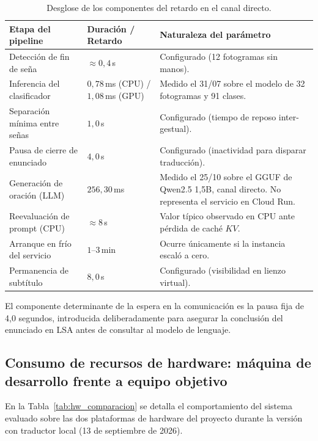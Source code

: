 \begin{table}[H]
    \centering
    \small
    \caption{Desglose de los componentes del retardo en el canal directo.}
    \label{tab:latencias_etapas}
    \begin{tabularx}{\textwidth}{@{}>{\raggedright\arraybackslash}p{} >{\raggedright\arraybackslash}p{} >{\raggedright\arraybackslash}X@{}}
        \toprule
        \textbf{Etapa del pipeline} & \textbf{Duración / Retardo} & \textbf{Naturaleza del parámetro} \\
        \midrule
        Detección de fin de seña & $\approx 0{,}4$\,s & Configurado (12 fotogramas sin manos). \\
        Inferencia del clasificador & $0{,}78$\,ms (CPU) / $1{,}08$\,ms (GPU) & Medido el 31/07 sobre el modelo de 32 fotogramas y 91 clases. \\
        Separación mínima entre señas & $1{,}0$\,s & Configurado (tiempo de reposo inter-gestual). \\
        Pausa de cierre de enunciado & $4{,}0$\,s & Configurado (inactividad para disparar traducción). \\
        Generación de oración (LLM) & $256{,}30$\,ms & Medido el 25/10 sobre el GGUF de Qwen2.5 1,5B, canal directo. No representa el servicio en Cloud Run. \\
        Reevaluación de prompt (CPU) & $\approx 8$\,s & Valor típico observado en CPU ante pérdida de caché $KV$. \\
        Arranque en frío del servicio & $1$--$3$\,min & Ocurre únicamente si la instancia escaló a cero. \\
        Permanencia de subtítulo & $8{,}0$\,s & Configurado (visibilidad en lienzo virtual). \\
        \bottomrule
    \end{tabularx}
\end{table}

El componente determinante de la espera en la comunicación es la pausa fija de 4,0 segundos, introducida deliberadamente para asegurar la conclusión del enunciado en LSA antes de consultar al modelo de lenguaje.

\subsection{Consumo de recursos de hardware: máquina de desarrollo frente a equipo objetivo}
\label{sec:hardware_objetivo}
En la Tabla~\ref{tab:hw_comparacion} se detalla el comportamiento del sistema evaluado sobre las dos plataformas de hardware del proyecto durante la versión con traductor local (13 de septiembre de 2026).

